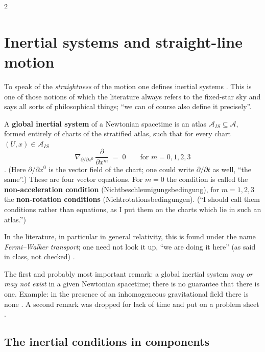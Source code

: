 \begin{paracol}{2}
\section{Inertial systems and straight-line motion}\label{sec:nk-inertial}

To speak of the \emph{straightness} of the motion one defines inertial systems . This is one of those notions of which the literature always refers to the fixed-star sky and says all sorts of philosophical things;
``we can of course also define it precisely''.

\begin{definition}\label{def:nk-inertial}
A \textbf{global inertial system} of a Newtonian spacetime is an atlas $\mathcal A_{IS}\subseteq\mathcal A$, formed entirely of charts of the stratified atlas, such that for every chart $(U,x)\in\mathcal A_{IS}$
\begin{equation}\label{eq:nk-inertial}
  \nabla_{\partial/\partial x^0}\,\frac{\partial}{\partial x^m}\;=\;0\qquad\text{for }m=0,1,2,3
\end{equation}
. (Here $\partial/\partial x^0$ is the vector field of the chart; one could write $\partial/\partial t$ as well, ``the same''.)
These are four vector equations. For $m=0$ the condition is called the \textbf{non-acceleration condition} (Nichtbeschleunigungsbedingung), for $m=1,2,3$ the \textbf{non-rotation conditions} (Nichtrotationsbedingungen).
(``I should call them conditions rather than equations, as I put them on the charts which lie in such an atlas.'') 
\end{definition}
In the literature, in particular in general relativity, this is found under the name \emph{Fermi--Walker transport}; one need not look it up, ``we are doing it here'' (as said in class, not checked) .

The first and probably most important remark: a global inertial system \emph{may or may not exist} in a given Newtonian spacetime; there is no guarantee that there is one. Example: in the presence of an inhomogeneous gravitational field there is none
. A second remark was dropped for lack of time and put on a problem sheet .

\subsection{The inertial conditions in components}\label{ssec:nk-inertial-comp}


\end{paracol}
